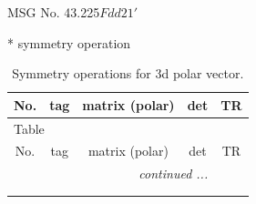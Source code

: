\documentclass[fleqn,8pt]{jsarticle}
\begin{document}
\setcounter{MaxMatrixCols}{32}

\renewcommand{\tablename}{Table~}
\renewcommand{\figurename}{Figure~}
\begin{center}
\LARGE
MSG No. 43.225\quad$Fdd21'$
\end{center}
* symmetry operation
\renewcommand{\arraystretch}{1.3}
\begin{longtable}{ccccc}
\caption{Symmetry operations for 3d polar vector.}
 \\
 \hline \hline
No. & tag & matrix (polar) & det & TR \\ \hline \endfirsthead

\multicolumn{4}{l}{\tablename\ \thetable{}} \\
 \hline \hline
No. & tag & matrix (polar) & det & TR \\ \hline \endhead

 \hline \hline
\multicolumn{4}{r}{\footnotesize\it continued ...} \\ \endfoot

 \hline \hline
\multicolumn{4}{r}{} \\ \endlastfoot


\end{longtable}
\end{document}
